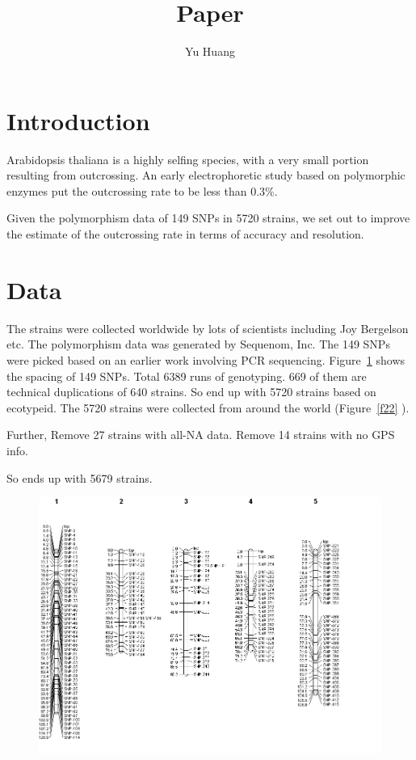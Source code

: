 \documentclass[a4paper,10pt]{article}
\title{Paper}
\author{Yu Huang}
\begin{document}
\maketitle

\begin{abstract}

\end{abstract}

\section{Introduction}
Arabidopsis thaliana is a highly selfing species, with a very small portion resulting from outcrossing. An early electrophoretic study based on polymorphic enzymes\cite{Abbott1989} put the outcrossing rate to be less than 0.3\%.

Given the polymorphism data of 149 SNPs in 5720 strains, we set out to improve the estimate of the outcrossing rate in terms of accuracy and resolution.

\section{Data}
The strains were collected worldwide by lots of scientists including Joy Bergelson etc. The polymorphism data was generated by Sequenom, Inc. The 149 SNPs were picked based on an earlier work involving PCR sequencing\cite{Nordborg2005}. Figure~\ref{f1} shows the spacing of 149 SNPs.
Total 6389 runs of genotyping. 669 of them are technical duplications of 640 strains. So end up with 5720 strains based on ecotypeid. The 5720 strains were collected from around the world (Figure~\ref{f22} ).

Further, Remove 27 strains with all-NA data. Remove 14 strains with no GPS info.

So ends up with 5679 strains.

\begin{figure}
\includegraphics[width=1\textwidth]{figures/snp_locations_on_chr.png}
\caption{}\label{f1}
\end{figure}
\end{document}
